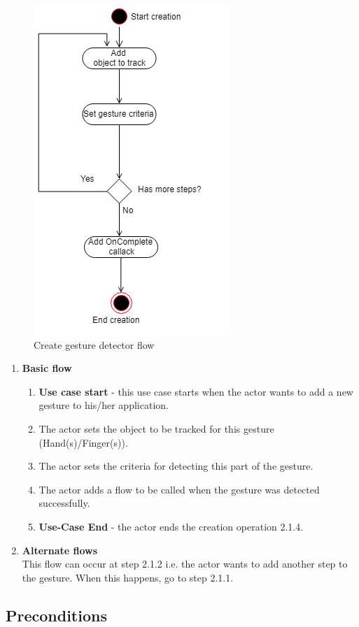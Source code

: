 \documentclass[12pt,a4paper,twoside]{report}
\begin{document}
\begin{figure}[h]
  \centering
  \includegraphics[width=0.4\linewidth]{img/UC_create.png}
  \caption{Create gesture detector flow}
  \label{fig:uc_create}
\end{figure}

\begin{enumerate}
  \item \textbf{Basic flow} \\
    \begin{enumerate}
      \item \textbf{Use case start} - this use case starts when the actor wants to add a new gesture to his/her application.
      \item The actor sets the object to be tracked for this gesture (Hand(s)/Finger(s)).
      \item The actor sets the criteria for detecting this part of the gesture.
      \item The actor adds a flow to be called when the gesture was detected successfully.
      \item \textbf{Use-Case End} - the actor ends the creation operation 2.1.4.
    \end{enumerate}
  \item \textbf{Alternate flows} \\
    This flow can occur at step 2.1.2 i.e. the actor wants to add another step to the gesture. When this happens, go to step 2.1.1.
\end{enumerate}

\subsection{Preconditions}
\end{document}
